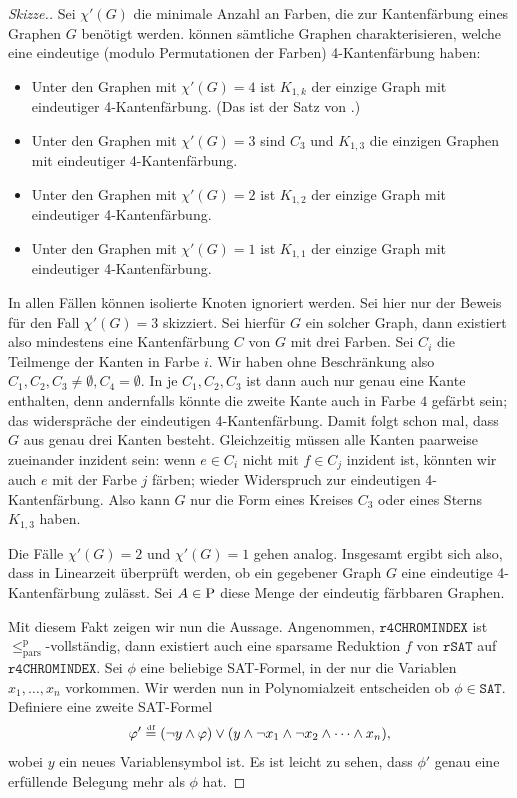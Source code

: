 \begin{proof}[Skizze.]
    Sei $\chi'(G)$ die minimale Anzahl an Farben, die zur Kantenfärbung eines Graphen $G$ benötigt werden.
    \citeauthor{cai_complexity_2020} können  
    sämtliche Graphen charakterisieren, welche eine eindeutige (modulo Permutationen der Farben) 4-Kantenfärbung haben:
    \begin{itemize}[nosep,beginpenalty=0]
        \item Unter den Graphen mit $\chi'(G)=4$ ist $K_{1,k}$ der einzige Graph mit eindeutiger 4-Kantenfärbung. (Das ist der Satz von \cite{thomason_hamiltonian_1978}.)
        \item Unter den Graphen mit $\chi'(G)=3$ sind $C_3$ und $K_{1,3}$ die einzigen Graphen mit eindeutiger 4-Kantenfärbung.
        \item Unter den Graphen mit $\chi'(G)=2$ ist $K_{1,2}$ der einzige Graph mit eindeutiger 4-Kantenfärbung.
        \item Unter den Graphen mit $\chi'(G)=1$ ist $K_{1,1}$ der einzige Graph mit eindeutiger 4-Kantenfärbung.
    \end{itemize}
    In allen Fällen können isolierte Knoten ignoriert werden. Sei hier nur der Beweis für den Fall $\chi'(G)=3$ skizziert. Sei hierfür $G$ ein solcher Graph, dann existiert also mindestens eine Kantenfärbung $C$ von $G$ mit drei Farben. Sei $C_i$ die Teilmenge der Kanten in Farbe $i$.
    Wir haben ohne Beschränkung also $C_1,C_2,C_3\neq\emptyset, C_4=\emptyset$.
    In je $C_1,C_2,C_3$ ist dann auch nur genau eine Kante enthalten, denn andernfalls könnte die zweite Kante auch in Farbe $4$ gefärbt sein; das widerspräche der eindeutigen 4-Kantenfärbung.
    Damit folgt schon mal, dass $G$ aus genau drei Kanten besteht.
    Gleichzeitig müssen alle Kanten paarweise zueinander inzident sein: wenn $e\in C_i$ nicht mit $f\in C_j$ inzident ist, könnten wir auch $e$ mit der Farbe $j$ färben; wieder Widerspruch zur eindeutigen 4-Kantenfärbung.
    Also kann $G$ nur die Form eines Kreises $C_3$ oder eines Sterns $K_{1,3}$ haben.

    Die Fälle $\chi'(G)=2$ und $\chi'(G)=1$ gehen analog.
    Insgesamt ergibt sich also, dass in Linearzeit überprüft werden, ob ein gegebener Graph $G$ eine eindeutige 4-Kantenfärbung zulässt. Sei $A\in \P$ diese Menge der eindeutig färbbaren Graphen.

    Mit diesem Fakt zeigen wir nun die Aussage.
    Angenommen, $\mathtt{r4CHROMINDEX}$ ist $\leq_\mathrm{pars}^\mathrm p$-vollständig, dann existiert auch eine sparsame Reduktion $f$ von $\mathtt{rSAT}$ auf $\mathtt{r4CHROMINDEX}$.
    Sei $\phi$ eine beliebige SAT-Formel, in der nur die Variablen $x_1, \dots, x_n$ vorkommen.
    Wir werden nun in Polynomialzeit entscheiden ob $\phi\in \mathtt{SAT}$. 
    Definiere eine zweite SAT-Formel
    \[ \phi' \defeq (\neg y \land \phi) \lor (y\land \neg x_1 \land \neg x_2 \land\cdots\land x_n), \]
    wobei $y$ ein neues Variablensymbol ist. Es ist leicht zu sehen, dass $\phi'$ genau eine erfüllende Belegung mehr als $\phi$ hat.


\end{proof}
